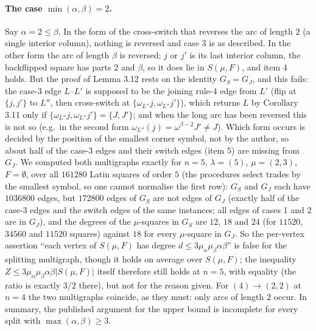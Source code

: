 \documentclass[11pt]{article}
\theoremstyle{remark}
\begin{document}
\paragraph{The case $\min(\alpha,\beta)=2$.}  Say $\alpha=2\le\beta$.
In the form of the cross-switch that reverses the arc of length $2$
(a single interior column), nothing is reversed and case 3 is as
described.  In the other form the arc of length $\beta$ is reversed;
$j$ or $j'$ is its last interior column, the backflipped square has
parts $2$ and $\beta$, so it does lie in $S(\mu,F)$, and item 4 holds.
But the proof of Lemma 3.12 rests on the identity $G_S=G_J$, and this
fails: the case-3 edge $L$--$L'$ is supposed to be the joining rule-4
edge from $L'$ (flip at $\{j,j'\}$ to $L''$, then cross-switch at
$\{\omega_{L''}j,\omega_{L''}j'\}$), which returns $L$ by Corollary
3.11 only if $\{\omega_{L''}j,\omega_{L''}j'\}=\{J,J'\}$; and when the
long arc has been reversed this is not so (e.g.\ in the second form
$\omega_{L''}(j)=\omega^{\beta-2}J'\ne J$).  Which form occurs is
decided by the position of the smallest corner symbol, not by the
author, so about half of the case-3 edges and their switch edges
(item 5) are missing from $G_J$.  We computed both multigraphs exactly
for $n=5$, $\lambda=(5)$, $\mu=(2,3)$, $F=\emptyset$, over all
$161280$ Latin squares of order $5$ (the procedures select trades by
the smallest symbol, so one cannot normalise the first row): $G_S$ and
$G_J$ each have $1036800$ edges, but $172800$ edges of $G_S$ are not
edges of $G_J$ (exactly half of the case-3 edges and the switch edges
of the same instances; all edges of cases 1 and 2 are in $G_J$), and
the degrees of the $\mu$-squares in $G_S$ are $12$, $18$ and $24$ (for
$11520$, $34560$ and $11520$ squares) against $18$ for every
$\mu$-square in $G_J$.  So the per-vertex assertion ``each vertex of $S(\mu,F)$
has degree $d\le3\mu_\alpha\mu_\beta\alpha\beta$'' is false for the
splitting multigraph, though it holds on average over $S(\mu,F)$; the
inequality $Z\le3\mu_\alpha\mu_\beta\alpha\beta|S(\mu,F)|$ itself
therefore still holds at $n=5$, with equality (the ratio is exactly
$3/2$ there), but not for the reason given.  For
$(4)\to(2,2)$ at $n=4$ the two multigraphs coincide, as they must: only
arcs of length $2$ occur.  In summary, the published argument for the
upper bound is incomplete for every split with $\max(\alpha,\beta)\ge3$.
\end{document}
